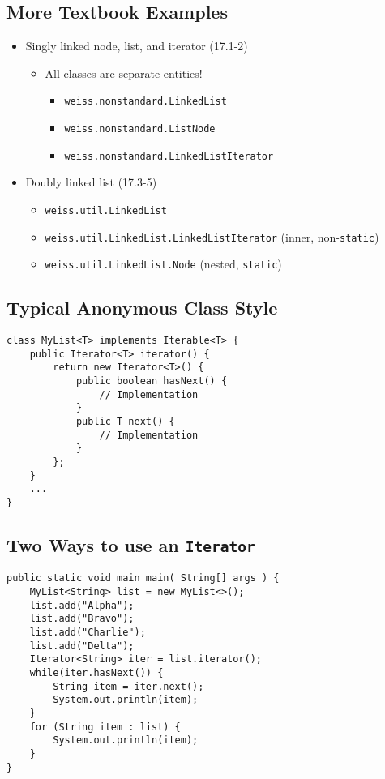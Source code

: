 \documentclass[10pt]{article}
\begin{document}
\subsection*{More Textbook Examples}
\begin{itemize}
    \item Singly linked node, list, and iterator (17.1-2)
    \begin{itemize}
        \item All classes are separate entities!
        \begin{itemize}
            \item \texttt{weiss.nonstandard.LinkedList}
            \item \texttt{weiss.nonstandard.ListNode}
            \item \texttt{weiss.nonstandard.LinkedListIterator}
        \end{itemize}
    \end{itemize}
    \item Doubly linked list (17.3-5)
    \begin{itemize}
        \item \texttt{weiss.util.LinkedList}
        \item \texttt{weiss.util.LinkedList.LinkedListIterator} (inner, non-\texttt{static})
        \item \texttt{weiss.util.LinkedList.Node} (nested, \texttt{static})
    \end{itemize}
\end{itemize}



\subsection*{Typical Anonymous Class Style}
\begin{verbatim}
class MyList<T> implements Iterable<T> {
    public Iterator<T> iterator() {
        return new Iterator<T>() {
            public boolean hasNext() {
                // Implementation
            }
            public T next() {
                // Implementation
            }
        };
    }
    ...
}
\end{verbatim}

\subsection*{Two Ways to use an \texttt{Iterator}}
\begin{verbatim}
public static void main main( String[] args ) {
    MyList<String> list = new MyList<>();
    list.add("Alpha");
    list.add("Bravo");
    list.add("Charlie");
    list.add("Delta");
    Iterator<String> iter = list.iterator();
    while(iter.hasNext()) {
        String item = iter.next();
        System.out.println(item);
    }
    for (String item : list) {
        System.out.println(item);
    }
}
\end{verbatim}
\end{document}
